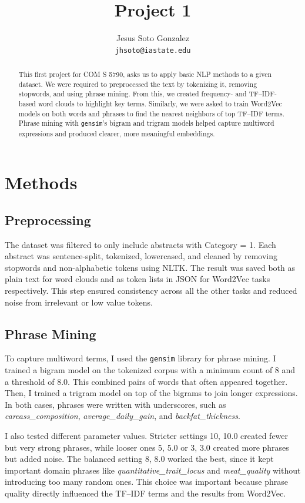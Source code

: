 \documentclass[11pt]{article}
\title{Project 1}
\author{Jesus Soto Gonzalez \\
  \texttt{jhsoto@iastate.edu}}
\begin{document}
\maketitle

\begin{abstract}
This first project for COM S 5790, asks us to apply basic NLP methods to a given dataset. 
We were required to preprocessed the text by tokenizing it, removing stopwords, and using phrase mining. 
From this, we created frequency- and TF--IDF-based word clouds to highlight key terms. 
Similarly, we were asked to train Word2Vec models on both words and phrases to find the nearest neighbors 
of top TF--IDF terms. Phrase mining with \texttt{gensim}'s bigram and trigram models helped capture multiword 
expressions and produced clearer, more meaningful embeddings.
\end{abstract}

\section{Methods}

\subsection{Preprocessing}
The dataset was filtered to only include abstracts with Category = 1. 
Each abstract was sentence-split, tokenized, lowercased, and cleaned by removing stopwords and non-alphabetic 
tokens using NLTK. The result was saved both as plain text for word clouds and as token lists in JSON for 
Word2Vec tasks respectively. This step ensured consistency across all the other tasks and reduced noise 
from irrelevant or low value tokens.

\subsection{Phrase Mining}
To capture multiword terms, I used the \texttt{gensim} library for phrase mining. 
I trained a bigram model on the tokenized corpus with a minimum count of 8 and a threshold of 8.0. 
This combined pairs of words that often appeared together. 
Then, I trained a trigram model on top of the bigrams to join longer expressions. 
In both cases, phrases were written with underscores, such as \textit{carcass\_composition}, 
\textit{average\_daily\_gain}, and \textit{backfat\_thickness}.  

I also tested different parameter values. 
Stricter settings 10, 10.0 created fewer but very strong phrases, while looser ones 5, 5.0 or 3, 3.0 
created more phrases but added noise. The balanced setting 8, 8.0 worked the best, since it kept important 
domain phrases like \textit{quantitative\_trait\_locus} and \textit{meat\_quality} without introducing too 
many random ones. This choice was important because phrase quality directly influenced the TF--IDF terms 
and the results from Word2Vec.
\end{document}
